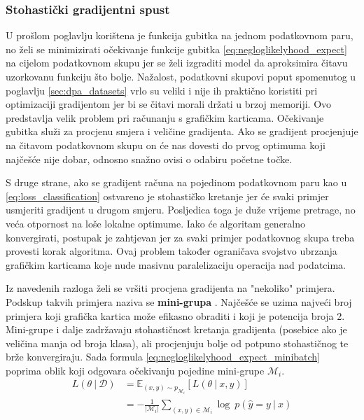 \documentclass[times, utf8, numeric, diplomski]{fer}
\def\expect{\mathbb{E}}
\def\probsep{\ |\ }
\def\dataset{\mathcal{D}}
\def\minibatch{\mathcal{M}}
\begin{document}
\subsubsection{Stohastički gradijentni spust}
U prošlom poglavlju korištena je funkcija gubitka na jednom podatkovnom paru, no želi se minimizirati očekivanje funkcije gubitka \eqref{eq:negloglikelyhood_expect} na cijelom podatkovnom skupu jer se želi izgraditi model da aproksimira čitavu uzorkovanu funkciju što bolje. Nažalost, podatkovni skupovi poput spomenutog u poglavlju \ref{sec:dpa_datasets} vrlo su veliki i nije ih praktično koristiti pri optimizaciji gradijentom jer bi se čitavi morali držati u brzoj memoriji. Ovo predstavlja velik problem pri računanju s grafičkim karticama. Očekivanje gubitka služi za procjenu smjera i veličine gradijenta. Ako se gradijent procjenjuje na čitavom podatkovnom skupu on će nas dovesti do prvog optimuma koji najčešće nije dobar, odnosno snažno ovisi o odabiru početne točke. 

S druge strane, ako se gradijent računa na pojedinom podatkovnom paru kao u \eqref{eq:loss_classification} ostvareno je stohastičko kretanje jer će svaki primjer usmjeriti gradijent u drugom smjeru. Posljedica toga je duže vrijeme pretrage, no veća otpornost na loše lokalne optimume. Iako će algoritam generalno konvergirati, postupak je zahtjevan jer za svaki primjer podatkovnog skupa treba provesti korak algoritma. Ovaj problem također ograničava svojstvo ubrzanja grafičkim karticama koje nude masivnu paralelizaciju operacija nad podatcima.

Iz navedenih razloga želi se vršiti procjena gradijenta na "nekoliko" primjera. Podskup takvih primjera naziva se \textbf{mini-grupa} . Najčešće se uzima najveći broj primjera koji grafička kartica može efikasno obraditi i koji je potencija broja 2. Mini-grupe i dalje zadržavaju stohastičnost kretanja gradijenta (posebice ako je veličina manja od broja klasa), ali procjenjuju bolje od potpuno stohastičnog te brže konvergiraju. Sada formula \eqref{eq:negloglikelyhood_expect_minibatch} poprima oblik koji odgovara očekivanju pojedine mini-grupe $\minibatch_i$.
\begin{equation}
\label{eq:negloglikelyhood_expect_minibatch}
\begin{split}
L(\theta \probsep \dataset) &= \expect_{(x,y) \sim p_{\minibatch_i}}[L(\theta \probsep x,y)] \\
&= -\frac{1}{|\minibatch_i|} \sum_{(x,y)\in\minibatch_i} \log\ p(\hat{y}=y \probsep x)
\end{split}
\end{equation}
\end{document}
